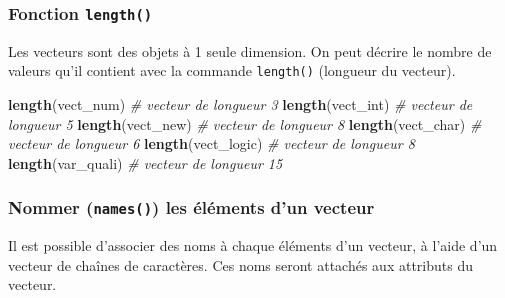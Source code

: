 \documentclass[
]{book}
\newenvironment{Shaded}{\begin{snugshade}}{\end{snugshade}}
\newcommand{\CommentTok}[1]{\textcolor[rgb]{0.56,0.35,0.01}{\textit{#1}}}
\newcommand{\FunctionTok}[1]{\textcolor[rgb]{0.13,0.29,0.53}{\textbf{#1}}}
\newcommand{\NormalTok}[1]{#1}
\begin{document}
\subsubsection{\texorpdfstring{Fonction \texttt{length()}}{Fonction length()}}\label{fonction-length}

Les vecteurs sont des objets à 1 seule dimension. On peut décrire le nombre de valeurs qu'il contient avec la commande \texttt{length()} (longueur du vecteur).

\begin{Shaded}
\begin{Highlighting}[]
\FunctionTok{length}\NormalTok{(vect\_num) }\CommentTok{\# vecteur de longueur 3}
\FunctionTok{length}\NormalTok{(vect\_int) }\CommentTok{\# vecteur de longueur 5}
\FunctionTok{length}\NormalTok{(vect\_new) }\CommentTok{\# vecteur de longueur 8}
\FunctionTok{length}\NormalTok{(vect\_char) }\CommentTok{\# vecteur de longueur 6}
\FunctionTok{length}\NormalTok{(vect\_logic) }\CommentTok{\# vecteur de longueur 8}
\FunctionTok{length}\NormalTok{(var\_quali) }\CommentTok{\# vecteur de longueur 15}
\end{Highlighting}
\end{Shaded}

\subsubsection{\texorpdfstring{Nommer (\texttt{names()}) les éléments d'un vecteur}{Nommer (names()) les éléments d'un vecteur}}\label{nommer-names-les-uxe9luxe9ments-dun-vecteur}

Il est possible d'associer des noms à chaque éléments d'un vecteur, à l'aide d'un vecteur de chaînes de caractères. Ces noms seront attachés aux attributs du vecteur.
\end{document}
